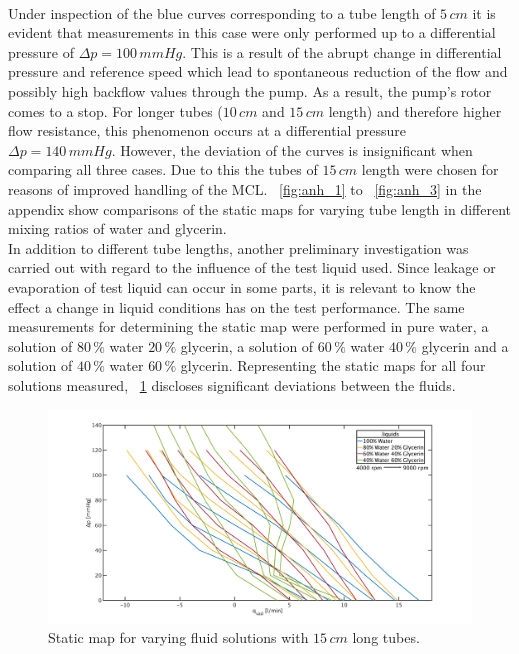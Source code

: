 \\Under inspection of the blue curves corresponding to a tube length of $5\, cm$ it is evident that measurements in this case were only performed up to a differential pressure of $\Delta{p}=100 \, mmHg$. This is a result of the abrupt change in differential pressure and reference speed which lead to spontaneous reduction of the flow and possibly high backflow values through the pump. As a result, the pump's rotor comes to a stop. For longer tubes ($10\, cm$ and $15\, cm$ length) and therefore higher flow resistance, this phenomenon occurs at a differential pressure $\Delta{p}=140\, mmHg$. However, the deviation of the curves is insignificant when comparing all three cases. Due to this the tubes of $15\, cm$ length were chosen for reasons of improved handling of the MCL. \figurename~\ref{fig:anh_1} to \figurename~\ref{fig:anh_3} in the appendix show comparisons of the static maps for varying tube length in different mixing ratios of water and glycerin.
\\In addition to different tube lengths, another preliminary investigation was carried out with regard to the influence of the test liquid used. Since leakage or evaporation of test liquid can occur in some parts, it is relevant to know the effect a change in liquid conditions has on the test performance. The same measurements for determining the static map were performed in pure water, a solution of $80\, \%$ water $20\, \%$ glycerin, a solution of $60\, \%$ water $40\, \%$ glycerin and a solution of $40\, \%$ water $60\, \%$ glycerin. Representing the static maps for all four solutions measured, \figurename~\ref{fig:long_tubes} discloses significant deviations between the fluids.
\begin{figure}[ht]
  \centering
  \includegraphics[width=\textwidth]{images/chapt_4/long_liquid_change_new.pdf}
  \caption[Static map for varying fluid solution with $15\,cm$ long tubes]{Static map for varying fluid solutions with $15\,cm$ long tubes.}
  \label{fig:long_tubes}
\end{figure}
